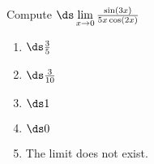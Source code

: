 \item Compute $\ds \lim\limits_{x\to 0} \frac{\sin(3x)}{5x\cos(2x)}$

\begin{multicols}{2}
	\begin{enumerate}\setlength{\itemsep}{.25cm}
	\item $\ds \frac35$ %
	\item $\ds \frac{3}{10}$
	\item $\ds 1$
	\item $\ds 0$
	\item The limit does not exist.
	\end{enumerate}
\end{multicols}
 
